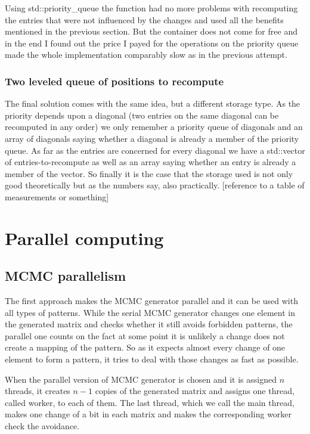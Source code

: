 Using std::priority\_queue the function had no more problems with recomputing the entries that were not influenced by the changes and used all the benefits mentioned in the previous section. But the container does not come for free and in the end I found out the price I payed for the operations on the priority queue made the whole implementation comparably slow as in the previous attempt.
\subsubsection{Two leveled queue of positions to recompute}
The final solution comes with the same idea, but a different storage type. As the priority depends upon a diagonal (two entries on the same diagonal can be recomputed in any order) we only remember a priority queue of diagonals and an array of diagonals saying whether a diagonal is already a member of the priority queue. As far as the entries are concerned for every diagonal we have a std::vector of entries-to-recompute as well as an array saying whether an entry is already a member of the vector. So finally it is the case that the storage used is not only good theoretically but as the numbers say, also practically. [reference to a table of measurements or something]

\section{Parallel computing}


\subsection{MCMC parallelism}
The first approach makes the MCMC generator parallel and it can be used with all types of patterns. While the serial MCMC generator changes one element in the generated matrix and checks whether it still avoids forbidden patterns, the parallel one counts on the fact at some point it is unlikely a change does not create a mapping of the pattern. So as it expects almost every change of one element to form a pattern, it tries to deal with those changes as fast as possible.

When the parallel version of MCMC generator is chosen and it is assigned $n$ threads, it creates $n-1$ copies of the generated matrix and assigns one thread, called worker, to each of them. The last thread, which we call the main thread, makes one change of a bit in each matrix and makes the corresponding worker check the avoidance.

